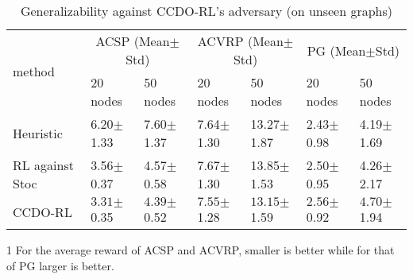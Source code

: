 \begin{table}[htp]
  \caption{Generalizability against CCDO-RL's adversary (on unseen graphs)}
  \vspace{\baselineskip}
  \label{tab_gene}
  \centering
  \small
  \begin{threeparttable}
  \begin{tabular}{lllllll}
    \toprule
    \multirow{2}{*}{method} & \multicolumn{2}{c}{ACSP (Mean$\pm$Std)} & \multicolumn{2}{c}{ACVRP (Mean$\pm$Std)} & \multicolumn{2}{c}{PG (Mean$\pm$Std)} \\
    \cmidrule(r){2-3} \cmidrule{4-5} \cmidrule(r){6-7}
                            & 20 nodes & 50 nodes & 20 nodes & 50 nodes & 20 nodes & 50 nodes\\
    \midrule
    Heuristic & 6.20$\pm$1.33 & 7.60$\pm$1.37   & 7.64$\pm$1.30  & 13.27$\pm$1.87 & 2.43$\pm$0.98 & 4.19$\pm$1.69    \\
    RL against Stoc  & 3.56$\pm$0.37  & 4.57$\pm$0.58  & 7.67$\pm$1.30  & 13.85$\pm$1.53 &  2.50$\pm$0.95 & 4.26$\pm$2.17 \\
    CCDO-RL   & $\pmb{3.31}$$\pm$0.35 & $\pmb{4.39}$$\pm$0.52  & $\pmb{7.55}$$\pm$1.28  & $\pmb{13.15}$$\pm$1.59 & $\pmb{2.56}$$\pm$0.92 & $\pmb{4.70}$$\pm$1.94\\

    \bottomrule
  \end{tabular}
  \begin{tablenotes}
      \footnotesize
      \item[1] For the average reward of ACSP and ACVRP, smaller is better while for that of PG larger is better.
  \end{tablenotes}
  \end{threeparttable}
\end{table}
\vspace{-\baselineskip}

